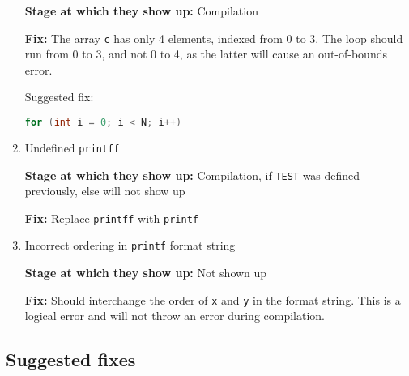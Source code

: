 \begin{enumerate}
            \textbf{Stage at which they show up:}
            Compilation

            \textbf{Fix:}
            The array \texttt{c} has only 4 elements, indexed from 0 to 3.
            The loop should run from 0 to 3, and not 0 to 4, as the latter will cause an out-of-bounds error.

            Suggested fix:
            \begin{lstlisting}[language=C, frame=single]
for (int i = 0; i < N; i++)
            \end{lstlisting}

      \item Undefined \texttt{printff}

            \textbf{Stage at which they show up:}
            Compilation, if \texttt{TEST} was defined previously, else will not show up

            \textbf{Fix:}
            Replace \texttt{printff} with \texttt{printf}

      \item Incorrect ordering in \texttt{printf} format string

            \textbf{Stage at which they show up:}
            Not shown up

            \textbf{Fix:}
            Should interchange the order of \texttt{x} and \texttt{y} in the format string.
            This is a logical error and will not throw an error during compilation.

\end{enumerate}

\subsection*{Suggested fixes}


